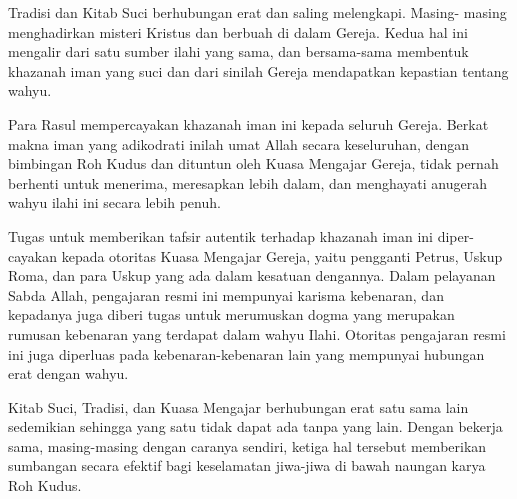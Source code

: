 \newpage
{}
\setcounter{kgkcounter}{13}
{\normalsize

    Tradisi dan Kitab Suci berhubungan erat dan saling melengkapi. Masing-           
masing menghadirkan misteri Kristus dan berbuah di dalam Gereja. Kedua hal ini       
mengalir dari satu sumber ilahi yang sama, dan bersama-sama membentuk khazanah
iman yang suci dan dari sinilah Gereja mendapatkan kepastian tentang wahyu.

Para Rasul mempercayakan khazanah iman ini kepada seluruh Gereja.
Berkat makna iman yang adikodrati inilah umat Allah secara keseluruhan, dengan
bimbingan Roh Kudus dan dituntun oleh Kuasa Mengajar Gereja, tidak pernah
berhenti untuk menerima, meresapkan lebih dalam, dan menghayati anugerah
wahyu ilahi ini secara lebih penuh.

Tugas untuk memberikan tafsir autentik terhadap khazanah iman ini diper-
cayakan kepada otoritas Kuasa Mengajar Gereja, yaitu pengganti Petrus, Uskup
Roma, dan para Uskup yang ada dalam kesatuan dengannya. Dalam pelayanan
Sabda Allah, pengajaran resmi ini mempunyai karisma kebenaran, dan kepadanya
juga diberi tugas untuk merumuskan dogma yang merupakan rumusan kebenaran
yang terdapat dalam wahyu Ilahi. Otoritas pengajaran resmi ini juga diperluas pada
kebenaran-kebenaran lain yang mempunyai hubungan erat dengan wahyu.

Kitab Suci, Tradisi, dan Kuasa Mengajar berhubungan erat satu sama lain
sedemikian sehingga yang satu tidak dapat ada tanpa yang lain. Dengan bekerja
sama, masing-masing dengan caranya sendiri, ketiga hal tersebut memberikan
sumbangan secara efektif bagi keselamatan jiwa-jiwa di bawah naungan karya
Roh Kudus.

}